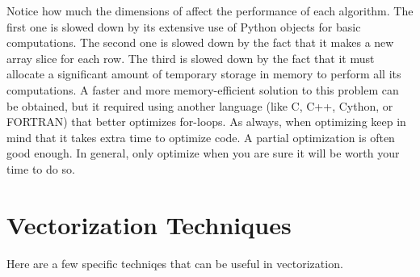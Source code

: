 Notice how much the dimensions of  affect the performance of each algorithm.
The first one is slowed down by its extensive use of Python objects for basic computations.
The second one is slowed down by the fact that it makes a new array slice for each row.
The third is slowed down by the fact that it must allocate a significant amount of temporary storage in memory to perform all its computations.
A faster and more memory-efficient solution to this problem can be obtained, but it required using another language (like C, C++, Cython, or FORTRAN) that better optimizes for-loops.
As always, when optimizing keep in mind that it takes extra time to optimize code.
A partial optimization is often good enough.
In general, only optimize when you are sure it will be worth your time to do so.

\section*{Vectorization Techniques}

Here are a few specific techniqes that can be useful in vectorization.

